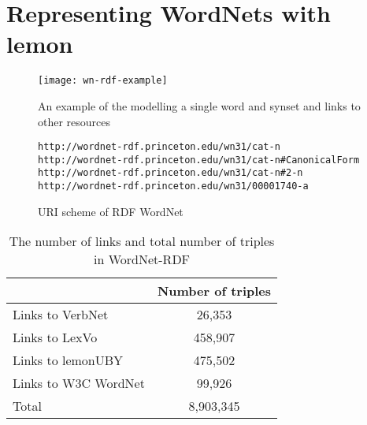 \documentclass[10pt, a4paper]{article}
\begin{document}
\section{Representing WordNets with lemon}

\begin{figure}
    \texttt{[image: wn-rdf-example]}
    \caption{An example of the modelling a single word and synset and links to
        other resources\label{modelling_example}}
\end{figure}


\begin{figure*}
\begin{verbatim}
http://wordnet-rdf.princeton.edu/wn31/cat-n
http://wordnet-rdf.princeton.edu/wn31/cat-n#CanonicalForm
http://wordnet-rdf.princeton.edu/wn31/cat-n#2-n
http://wordnet-rdf.princeton.edu/wn31/00001740-a
\end{verbatim}
\caption{URI scheme of RDF WordNet\label{uri-examples}}
\end{figure*}

\begin{table}
  \begin{tabular}{p{50mm}|c}
     & Number of triples \\
    \hline
    Links to VerbNet & 26,353 \\
    Links to LexVo & 458,907 \\
    Links to lemonUBY & 475,502 \\
    Links to W3C WordNet & 99,926 \\
    \hline
    Total & 8,903,345 \\
  \end{tabular}
  \caption{The number of links and total number of triples in
      WordNet-RDF\label{triple_counts}}
\end{table}
\end{document}
